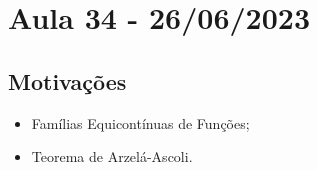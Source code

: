 \documentclass[../analysis_notes.tex]{subfiles}
\begin{document}
\section{Aula 34 - 26/06/2023}
\subsection{Motivações}
\begin{itemize}
	\item Famílias Equicontínuas de Funções;
	\item Teorema de Arzelá-Ascoli.
\end{itemize}
\end{document}
